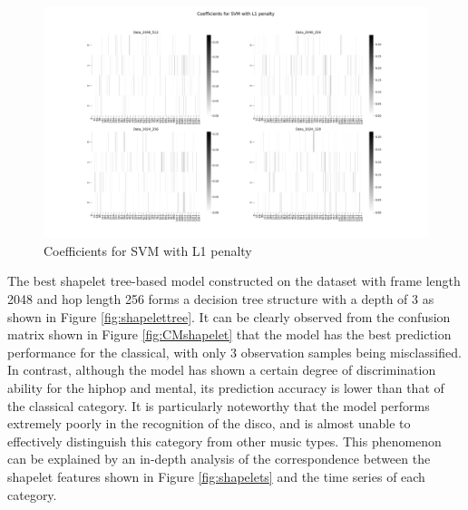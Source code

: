 \begin{figure}[H]
	\centering
	\includegraphics[width=0.9\linewidth]{../Statistical_Sciences_template/figure/Coefficients for SVM with L1 penalty.png}
	\caption{Coefficients for SVM with L1 penalty}
	\label{fig:SVMcoef}
\end{figure}
\noindent The best shapelet tree-based model constructed on the dataset with frame length 2048 and hop length 256 forms a decision tree structure with a depth of 3 as shown in Figure \ref{fig:shapelettree}. It can be clearly observed from the confusion matrix shown in Figure \ref{fig:CMshapelet} that the model has the best prediction performance for the classical, with only 3 observation samples being misclassified. In contrast, although the model has shown a certain degree of discrimination ability for the hiphop and mental, its prediction accuracy is lower than that of the classical category. It is particularly noteworthy that the model performs extremely poorly in the recognition of the disco, and is almost unable to effectively distinguish this category from other music types. This phenomenon can be explained by an in-depth analysis of the correspondence between the shapelet features shown in Figure \ref{fig:shapelets} and the time series of each category.\\
\\
\begin{center}
	\label{fig:shapelettree}
\end{center}
